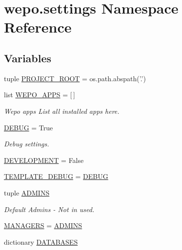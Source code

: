 \hypertarget{namespacewepo_1_1settings}{\section{wepo.\-settings Namespace Reference}
\label{namespacewepo_1_1settings}
}
\subsection*{Variables}
\begin{DoxyCompactItemize}
\item 
tuple \hyperlink{namespacewepo_1_1settings_afe30a5558df09d1195f567c20585d733}{P\-R\-O\-J\-E\-C\-T\-\_\-\-R\-O\-O\-T} = os.\-path.\-abspath('.')
\item 
list \hyperlink{namespacewepo_1_1settings_a74d020979efd117e8d7ae92a0e025ea5}{W\-E\-P\-O\-\_\-\-A\-P\-P\-S} = \mbox{[}$\,$\mbox{]}
\begin{DoxyCompactList}\small\item\em Wepo apps List all installed apps here. \end{DoxyCompactList}\item 
\hyperlink{namespacewepo_1_1settings_a892de685064f9fb7550c2f85f84f2992}{D\-E\-B\-U\-G} = True
\begin{DoxyCompactList}\small\item\em Debug settings. \end{DoxyCompactList}\item 
\hyperlink{namespacewepo_1_1settings_ae5c23c654f8de88bf5400722dfe27159}{D\-E\-V\-E\-L\-O\-P\-M\-E\-N\-T} = False
\item 
\hyperlink{namespacewepo_1_1settings_a0f6674bef75273821f06faa219b29eeb}{T\-E\-M\-P\-L\-A\-T\-E\-\_\-\-D\-E\-B\-U\-G} = \hyperlink{namespacewepo_1_1settings_a892de685064f9fb7550c2f85f84f2992}{D\-E\-B\-U\-G}
\item 
tuple \hyperlink{namespacewepo_1_1settings_a06724aae9ad20b264f7cd38d9382223d}{A\-D\-M\-I\-N\-S}
\begin{DoxyCompactList}\small\item\em Default Admins -\/ Not in used. \end{DoxyCompactList}\item 
\hyperlink{namespacewepo_1_1settings_a65ccd124bb58f3ba4051c72c6f91a2e2}{M\-A\-N\-A\-G\-E\-R\-S} = \hyperlink{namespacewepo_1_1settings_a06724aae9ad20b264f7cd38d9382223d}{A\-D\-M\-I\-N\-S}
\item 
dictionary \hyperlink{namespacewepo_1_1settings_a7c1f9a17ae1a4cfa095e42b10e071f82}{D\-A\-T\-A\-B\-A\-S\-E\-S}

\end{DoxyCompactItemize}
